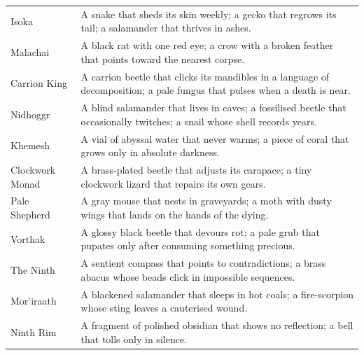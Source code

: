 \begin{longtable}{@{}p{4.2cm}p{9.4cm}@{}}
  Isoka & A snake that sheds its skin weekly; a gecko that regrows its tail; a salamander that thrives in ashes. \\
  Malachai & A black rat with one red eye; a crow with a broken feather that points toward the nearest corpse. \\
  Carrion King & A carrion beetle that clicks its mandibles in a language of decomposition; a pale fungus that pulses when a death is near. \\
  Nidhoggr & A blind salamander that lives in caves; a fossilised beetle that occasionally twitches; a snail whose shell records years. \\
  Khemesh & A vial of abyssal water that never warms; a piece of coral that grows only in absolute darkness. \\
  Clockwork Monad & A brass-plated beetle that adjusts its carapace; a tiny clockwork lizard that repairs its own gears. \\
  Pale Shepherd & A gray mouse that nests in graveyards; a moth with dusty wings that lands on the hands of the dying. \\
  Vorthak & A glossy black beetle that devours rot; a pale grub that pupates only after consuming something precious. \\
  The Ninth & A sentient compass that points to contradictions; a brass abacus whose beads click in impossible sequences. \\
  Mor'iraath & A blackened salamander that sleeps in hot coals; a fire-scorpion whose sting leaves a cauterised wound. \\
  Ninth Rim & A fragment of polished obsidian that shows no reflection; a bell that tolls only in silence. \\


\end{longtable}
